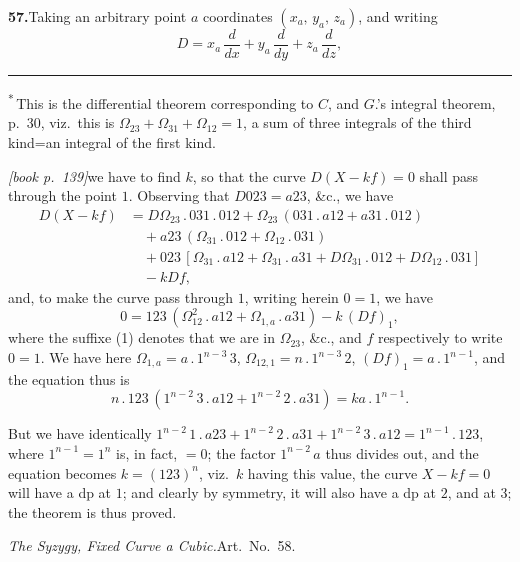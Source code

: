 \documentclass[11pt,a4paper]{article}
\theoremstyle{plain}
\theoremstyle{definition}
\theoremstyle{remark}
\begin{document}
\medskip\noindent\textbf{57.}\quad Taking an arbitrary point $a$ coordinates $(x_a,\,y_a,\,z_a)$, and writing
\[
D = x_a\,\frac{d}{dx} + y_a\,\frac{d}{dy} + z_a\,\frac{d}{dz},
\]
\bigskip
\hrule
\smallskip
\noindent\textsuperscript{*}\,This is the differential theorem corresponding to $C$, and $G$.'s integral theorem, p.\ 30, viz.\ this is $\Omega_{23} + \Omega_{31} + \Omega_{12} = 1$, a sum of three integrals of the third kind=an integral of the first kind.

\medskip\noindent\textit{[book p.~139]}\quad we have to find $k$, so that the curve $D(X - kf) = 0$ shall pass through the point $1$. Observing that $D023 = a23$, \&c., we have
\begin{align*}
D(X - kf) &= D\Omega_{23}\,.\,031\,.\,012 + \Omega_{23}\,(031\,.\,a12 + a31\,.\,012)\\
&\quad + a23\,(\Omega_{31}\,.\,012 + \Omega_{12}\,.\,031)\\
&\quad + 023\,[\Omega_{31}\,.\,a12 + \Omega_{31}\,.\,a31 + D\Omega_{31}\,.\,012 + D\Omega_{12}\,.\,031]\\
&\quad - kDf,
\end{align*}
and, to make the curve pass through $1$, writing herein $0 = 1$, we have
\[
0 = 123\,(\Omega_{12}^{2}\,.\,a12 + \Omega_{1,a}\,.\,a31) - k\,(Df)_{1},
\]
where the suffixe (1) denotes that we are in $\Omega_{23}$, \&c., and $f$ respectively to write $0 = 1$. We have here $\Omega_{1,a} = a\,.\,1^{n-3}\,3$, $\Omega_{12,1} = n\,.\,1^{n-3}\,2$, $(Df)_{1} = a\,.\,1^{n-1}$, and the equation thus is
\[
n\,.\,123\,(1^{n-2}\,3\,.\,a12 + 1^{n-2}\,2\,.\,a31) = ka\,.\,1^{n-1}.
\]

But we have identically $1^{n-2}\,1\,.\,a23 + 1^{n-2}\,2\,.\,a31 + 1^{n-2}\,3\,.\,a12 = 1^{n-1}\,.\,123$, where $1^{n-1} = 1^{n}$ is, in fact, $= 0$; the factor $1^{n-2}\,a$ thus divides out, and the equation becomes $k = (123)^{n}$, viz.\ $k$ having this value, the curve $X - kf = 0$ will have a dp at $1$; and clearly by symmetry, it will also have a dp at $2$, and at $3$; the theorem is thus proved.

\medskip\noindent\textit{The Syzygy, Fixed Curve a Cubic.}\quad Art.\ No.\ 58.
\end{document}

